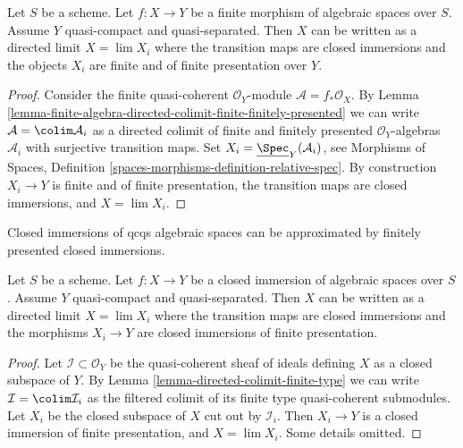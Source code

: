 \begin{lemma}
\label{lemma-finite-in-finite-and-finite-presentation}
Let $S$ be a scheme. Let $f : X \to Y$ be a finite morphism of algebraic
spaces over $S$. Assume $Y$ quasi-compact and quasi-separated.
Then $X$ can be written as a directed limit $X = \lim X_i$
where the transition maps are closed immersions and the objects
$X_i$ are finite and of finite presentation over $Y$.
\end{lemma}

\begin{proof}
Consider the finite quasi-coherent $\mathcal{O}_Y$-module
$\mathcal{A} = f_*\mathcal{O}_X$. By
Lemma \ref{lemma-finite-algebra-directed-colimit-finite-finitely-presented}
we can write $\mathcal{A} = \colim \mathcal{A}_i$ as a directed
colimit of finite and finitely presented $\mathcal{O}_Y$-algebras
$\mathcal{A}_i$ with surjective transition maps.
Set $X_i = \underline{\Spec}_Y(\mathcal{A}_i)$, see
Morphisms of Spaces, Definition
\ref{spaces-morphisms-definition-relative-spec}.
By construction $X_i \to Y$ is finite and of finite presentation,
the transition maps are closed immersions, and $X = \lim X_i$.
\end{proof}

\begin{lemma}
\label{lemma-closed-is-limit-closed-and-finite-presentation}
\begin{slogan}
Closed immersions of qcqs algebraic spaces can be approximated
by finitely presented closed immersions.
\end{slogan}
Let $S$ be a scheme. Let $f : X \to Y$ be a closed immersion of algebraic
spaces over $S$. Assume $Y$ quasi-compact and quasi-separated.
Then $X$ can be written as a directed limit $X = \lim X_i$
where the transition maps are closed immersions and the morphisms
$X_i \to Y$ are closed immersions of finite presentation.
\end{lemma}

\begin{proof}
Let $\mathcal{I} \subset \mathcal{O}_Y$ be the quasi-coherent sheaf
of ideals defining $X$ as a closed subspace of $Y$. By
Lemma \ref{lemma-directed-colimit-finite-type}
we can write $\mathcal{I} = \colim \mathcal{I}_i$ as the
filtered colimit of its finite type quasi-coherent submodules.
Let $X_i$ be the closed subspace of $X$ cut out by $\mathcal{I}_i$.
Then $X_i \to Y$ is a closed immersion of finite presentation,
and $X = \lim X_i$. Some details omitted.
\end{proof}

